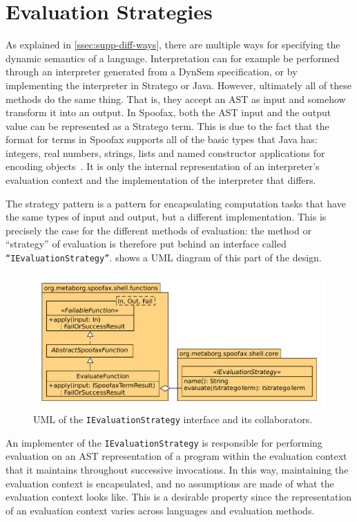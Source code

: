 \section{Evaluation Strategies}
\label{sec:eval-strat}
As explained in \cref{ssec:supp-diff-ways}, there are multiple ways for
specifying the dynamic semantics of a language. Interpretation can for example
be performed through an interpreter generated from a DynSem specification, or by
implementing the interpreter in Stratego or Java. However, ultimately all of
these methods do the same thing. That is, they accept an AST as input and
somehow transform it into an output. In Spoofax, both the AST input and the
output value can be represented as a Stratego term. This is due to the fact that
the format for terms in Spoofax supports all of the basic types that Java has:
integers, real numbers, strings, lists and named constructor applications for
encoding objects~\cite{Brand00}. It is only the internal representation of an
interpreter's evaluation context and the implementation of the interpreter that
differs.

The strategy pattern is a pattern for encapsulating computation tasks that have
the same types of input and output, but a different implementation. This is
precisely the case for the different methods of evaluation: the method or
``strategy'' of evaluation is therefore put behind an interface called
\texttt{``IEvaluationStrategy''}.  shows a UML diagram
of this part of the design.

\begin{figure}[b]
  \centering
  \includegraphics[width=\textwidth]{uml-eval-strat}
  \caption{UML of the \texttt{IEvaluationStrategy} interface and its
    collaborators.}
  \label{fig:uml-eval-strat}
\end{figure}

An implementer of the \texttt{IEvaluationStrategy} is responsible for performing
evaluation on an AST representation of a program within the evaluation context
that it maintains throughout successive invocations. In this way, maintaining
the evaluation context is encapsulated, and no assumptions are made of what the
evaluation context looks like. This is a desirable property since the
representation of an evaluation context varies across languages and evaluation
methods.

